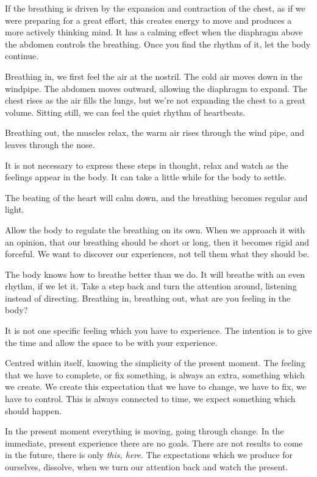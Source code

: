 If the breathing is driven by the expansion and contraction of the
chest, as if we were preparing for a great effort, this creates energy
to move and produces a more actively thinking mind. It has a calming
effect when the diaphragm above the abdomen controls the breathing. Once
you find the rhythm of it, let the body continue.

Breathing in, we first feel the air at the nostril. The cold air moves
down in the windpipe. The abdomen moves outward, allowing the diaphragm
to expand. The chest rises as the air fills the lungs, but we're not
expanding the chest to a great volume. Sitting still, we can feel the
quiet rhythm of heartbeats.

Breathing out, the muscles relax, the warm air rises through the wind
pipe, and leaves through the nose.

\enlargethispage*{\baselineskip}

It is not necessary to express these steps in thought, relax and watch
as the feelings appear in the body. It can take a little while for the
body to settle.

\clearpage
\null\thispagestyle{empty}%
%
%
\label{illus-breathing}%
\clearpage

The beating of the heart will calm down, and the
breathing becomes regular and light.

Allow the body to regulate the breathing on its own. When we approach it
with an opinion, that our breathing should be short or long, then it
becomes rigid and forceful. We want to discover our experiences, not
tell them what they should be.

The body knows how to breathe better than we do. It will breathe with an
even rhythm, if we let it. Take a step back and turn the attention
around, listening instead of directing. Breathing in, breathing out,
what are you feeling in the body?

It is not one specific feeling which you have to experience. The
intention is to give the time and allow the space to be with your
experience.

Centred within itself, knowing the simplicity of the present moment. The
feeling that we have to complete, or fix something, is always an extra,
something which we create. We create this expectation that we have to
change, we have to fix, we have to control. This is always connected to
time, we expect something which should happen.

In the present moment everything is moving, going through change. In the
immediate, present experience there are no goals. There are not results
to come in the future, there is only \emph{this, here}. The expectations
which we produce for ourselves, dissolve, when we turn our attention
back and watch the present.

